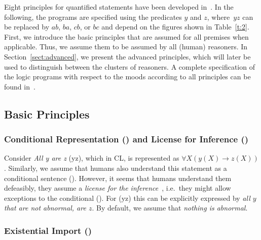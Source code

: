 \documentclass[12pt]{article}
\begin{document}
Eight principles for quantified statements have been developed in~\cite{cogsci:2017,costa:dietz:Hoelldobler:2017,declare:2017}.
In the following, the programs are
specified using the predicates $y$ and $z$, where~$yz$ can be replaced by $ab$, $ba$, $cb$, or $bc$ and depend on the figures shown in Table~\ref{t:2}. First, we introduce the basic principles that are assumed for all premises when applicable. Thus, we assume them to be assumed by all (human) reasoners. 
In Section~\ref{sect:advanced}, we present the advanced principles, which will 
later be used to distinguish between the clusters of reasoners.
A complete specification of the logic programs with respect to the moods according to all principles can be found in~\cite{declare:2017}.

\subsection{Basic Principles}   \label{sect:basic}

\subsubsection{Conditional Representation (\conditionals) and License for Inference (\licenses)}\label{sect:condli}
Consider \textit{All y are z} ({\MA yz}), which in CL, is represented as $\forall X (y(X) \rightarrow z(X))$.
Similarly, we assume that humans also understand this statement as a conditional sentence (\conditionals).
However, it seems that humans understand them defeasibly, they assume a \textit{license for the inference}~\cite{stenning:vanlambalgen:2008},
i.e.\ they might allow exceptions to the conditional (\licenses). For (\MA yz) this can be 
explicitly expressed by 
\textit{all $y$ that are not abnormal, are $z$}.
By default, we assume that \textit{nothing is abnormal}. %

\subsubsection{Existential Import ()}
\end{document}
